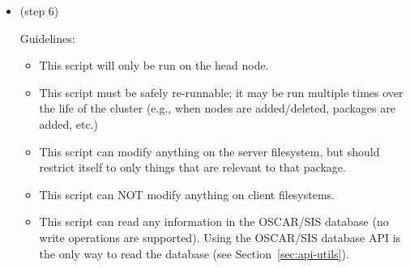 \begin{itemize}
  \begin{itemize}
  \item This script will be run on the client filesystem.  That is, it
    will either be chrooted to the image or run on all of the actual
    nodes themselves.
  \item This use of this API script is strongly discouraged.  The
    contents of this script should normally be contained in the \%post
    scripts in the RPMs themselves.  This API script is only here to
    help taking third party non-OSCAR-ized RPMs and graft them into
    the OSCAR framework without needing to re-make the RPM.
  \item This script must be safely re-runnable; it may be run multiple
    times over the life of the cluster.
  \item This script can modify anything on the client filesystem, but
    should restrict itself to only things that are relevant to that
    package.
  \item This script cannot use anything from the OSCAR/SIS database.
    \footnote{This may change in future versions of the API, but for
      now, nothing in the OSCAR/SIS DB is available during this step.}
    The only piece of global information that is available is the
    hostname oscar\_server, which will be set correctly in the
    /etc/hosts on every node/image.

    \begin{discuss}
      This point will become moot soon.
    \end{discuss}
  \end{itemize}

  Parameters:

  \begin{itemize}
  \item None.
  \end{itemize}

\item {} (step 6)

  Guidelines:

  \begin{itemize}
  \item This script will only be run on the head node.
  \item This script must be safely re-runnable; it may be run multiple
    times over the life of the cluster (e.g., when nodes are
    added/deleted, packages are added, etc.)
  \item This script can modify anything on the server filesystem, but
    should restrict itself to only things that are relevant to that
    package.
  \item This script can NOT modify anything on client filesystems.
  \item This script can read any information in the OSCAR/SIS database
    (no write operations are supported).  Using the OSCAR/SIS database
    API is the only way to read the database (see
    Section~\ref{sec:api-utils}).


\end{itemize}
\end{itemize}
